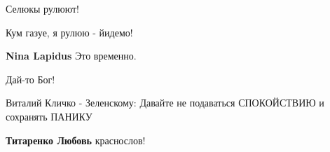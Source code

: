 \begin{itemize}
\begin{itemize}
 
Селюкы рулюют!

 
Кум газуе, я рулюю - йидемо!

 
\textbf{Nina Lapidus} Это временно.

 
Дай-то Бог!

\end{itemize}

 
Виталий Кличко - Зеленскому:
Давайте не подаваться СПОКОЙСТВИЮ
и сохранять ПАНИКУ

\begin{itemize}
 
\textbf{Титаренко Любовь} краснослов!

 

\end{itemize}
\end{itemize}
